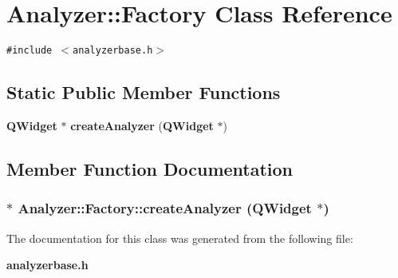 \section{Analyzer::Factory Class Reference}
\label{classAnalyzer_1_1Factory}
{\tt \#include $<$analyzerbase.h$>$}

\subsection*{Static Public Member Functions}
\begin{CompactItemize}
\item 
{\bf QWidget} $\ast$ {\bf create\-Analyzer} ({\bf QWidget} $\ast$)
\end{CompactItemize}


\subsection{Member Function Documentation}
\subsubsection{$\ast$ Analyzer::Factory::create\-Analyzer ({\bf QWidget} $\ast$)\hspace{0.3cm}{\tt  [static]}}\label{classAnalyzer_1_1Factory_Analyzer_1_1Factorye0}




The documentation for this class was generated from the following file:\begin{CompactItemize}
\item 
{\bf analyzerbase.h}\end{CompactItemize}
